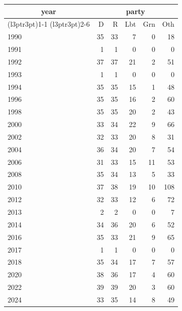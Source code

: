 \footnotesize\begin{tabular}[t]{lrrrrr}
\toprule
\multicolumn{1}{c}{year} & \multicolumn{5}{c}{party} \\
\cmidrule(l{3pt}r{3pt}){1-1} \cmidrule(l{3pt}r{3pt}){2-6}
  & D & R & Lbt & Grn & Oth\\
\midrule
1990 & 35 & 33 & 7 & 0 & 18\\
1991 & 1 & 1 & 0 & 0 & 0\\
1992 & 37 & 37 & 21 & 2 & 51\\
1993 & 1 & 1 & 0 & 0 & 0\\
1994 & 35 & 35 & 15 & 1 & 48\\
1996 & 35 & 35 & 16 & 2 & 60\\
1998 & 35 & 35 & 20 & 2 & 43\\
2000 & 33 & 34 & 22 & 9 & 66\\
2002 & 32 & 33 & 20 & 8 & 31\\
2004 & 36 & 34 & 20 & 7 & 54\\
2006 & 31 & 33 & 15 & 11 & 53\\
2008 & 35 & 34 & 13 & 5 & 33\\
2010 & 37 & 38 & 19 & 10 & 108\\
2012 & 32 & 33 & 12 & 6 & 72\\
2013 & 2 & 2 & 0 & 0 & 7\\
2014 & 34 & 36 & 20 & 6 & 52\\
2016 & 35 & 33 & 21 & 9 & 65\\
2017 & 1 & 1 & 0 & 0 & 0\\
2018 & 35 & 34 & 17 & 7 & 57\\
2020 & 38 & 36 & 17 & 4 & 60\\
2022 & 39 & 39 & 20 & 3 & 60\\
2024 & 33 & 35 & 14 & 8 & 49\\
\bottomrule
\end{tabular}

